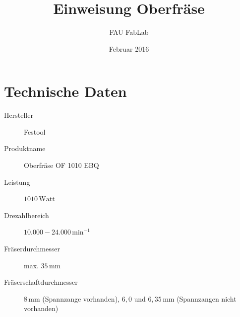 \documentclass{\basedir/fablab-document}
\date{Februar 2016}
\author{FAU FabLab} %
\title{Einweisung Oberfräse}
\begin{document}
\dosecttoc
\faketableofcontents
{}


\section{Technische Daten}
\begin{description}
    \item[Hersteller] Festool
    \item[Produktname] Oberfräse OF 1010 EBQ
    \item[Leistung] $1010\,\mathrm{Watt}$
    \item[Drezahlbereich] $10.000 - 24.000\,\mathrm{min}^{-1}$
    \item[Fräserdurchmesser] max. $35\,\mathrm{mm}$
    \item[Fräserschaftdurchmesser] $8\,\mathrm{mm}$ (Spannzange vorhanden), $6,0$ und $6,35\,\mathrm{mm}$ (Spannzangen nicht vorhanden)
    
\end{description}
\end{document}
